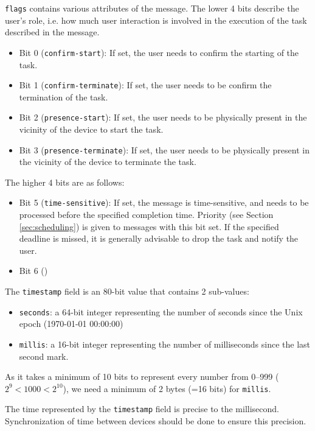 \documentclass[letterpaper, twocolumn, 10pt, conference]{IEEEtran}
\newcommand{\mono}[1]{\texttt{#1}}
\begin{document}
\mono{flags} contains various attributes of the message. The lower 4 bits describe the user's role, i.e. how much user interaction is involved in the execution of the task described in the message.
\begin{itemize}
	\setlength\itemsep{0pt}
	\item Bit 0 (\mono{confirm-start}): If set, the user needs to confirm the starting of the task.
	\item Bit 1 (\mono{confirm-terminate}): If set, the user needs to be confirm the termination of the task.
	\item Bit 2 (\mono{presence-start}): If set, the user needs to be physically present in the vicinity of the device to start the task.
	\item Bit 3 (\mono{presence-terminate}): If set, the user needs to be physically present in the vicinity of the device to terminate the task.
\end{itemize}
The higher 4 bits are as follows:
\begin{itemize}
	\setlength\itemsep{0pt}
	\item Bit 5 (\mono{time-sensitive}): If set, the message is time-sensitive, and needs to be processed before the specified completion time. Priority (see Section \ref{sec:scheduling}) is given to messages with this bit set. If the specified deadline is missed, it is generally advisable to drop the task and notify the user.
	\item Bit 6 ()
\end{itemize}
	
The \mono{timestamp} field is an 80-bit value that contains 2 sub-values:	
\begin{itemize}
	\setlength\itemsep{0pt}
	\item \mono{seconds}: a 64-bit integer representing the number of seconds since the Unix epoch (1970-01-01 00:00:00)	
	\item \mono{millis}: a 16-bit integer representing the number of milliseconds since the last second mark.	
\end{itemize}
As it takes a minimum of 10 bits to represent every number from 0--999 ($ 2^{9} < 1000 < 2^{10} $), we need a minimum of 2 bytes (=16 bits) for \mono{millis}.

The time represented by the \mono{timestamp} field is precise to the millisecond. Synchronization of time between devices should be done to ensure this precision.
	
\end{document}
